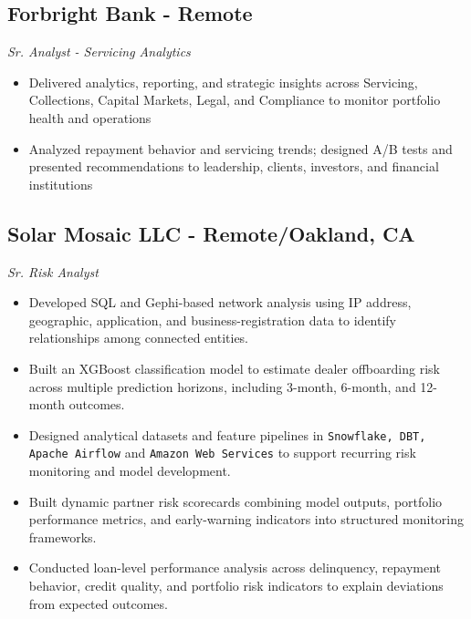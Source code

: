 \documentclass[11pt,a4paper]{article}
\newenvironment{myitemize}
{ \begin{itemize}[label={--}, leftmargin=*]
		\setlength{\itemsep}{0pt}
		\setlength{\parskip}{0pt}
		\setlength{\parsep}{0pt}     }
	{ \end{itemize}                  }
\begin{document}
			\vspace{-6mm} %
	\subsection*{Forbright Bank - Remote \hfill
					\vspace{-1mm} %
		  }
	\vspace{-1.5mm} %
	\textit{Sr. Analyst - Servicing Analytics}
	\vspace{-2.5mm} %
\begin{myitemize}
	\item Delivered analytics, reporting, and strategic insights across Servicing, Collections, Capital Markets, Legal, and Compliance to monitor portfolio health and operations
	\item Analyzed repayment behavior and servicing trends; designed A/B tests and presented recommendations to leadership, clients, investors, and financial institutions
\end{myitemize}
		\vspace{-6mm} %
	\subsection*{Solar Mosaic LLC - Remote/Oakland, CA \hfill
	\vspace{-1mm}
	 }
\vspace{-1.5mm}
\textit{Sr. Risk Analyst}
\vspace{-2.5mm}
\begin{myitemize}
	\item Developed SQL and Gephi-based network analysis using IP address, geographic, application, and business-registration data to identify relationships among connected entities.
\item Built an XGBoost classification model to estimate dealer offboarding risk across multiple prediction horizons, including 3-month, 6-month, and 12-month outcomes.
	\item Designed analytical datasets and feature pipelines in \texttt{Snowflake, DBT, Apache Airflow} and \texttt{Amazon Web Services} to support recurring risk monitoring and model development.
	\item Built dynamic partner risk scorecards combining model outputs, portfolio performance metrics, and early-warning indicators into structured monitoring frameworks.
	\item Conducted loan-level performance analysis across delinquency, repayment behavior, credit quality, and portfolio risk indicators to explain deviations from expected outcomes.
\end{myitemize}
		\vspace{-6mm} %
\end{document}

